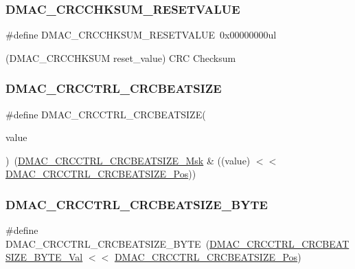 \subsubsection{\texorpdfstring{DMAC\_CRCCHKSUM\_RESETVALUE}{DMAC\_CRCCHKSUM\_RESETVALUE}}
{\footnotesize\ttfamily \#define D\+M\+A\+C\+\_\+\+C\+R\+C\+C\+H\+K\+S\+U\+M\+\_\+\+R\+E\+S\+E\+T\+V\+A\+L\+UE~0x00000000ul}



(D\+M\+A\+C\+\_\+\+C\+R\+C\+C\+H\+K\+S\+UM reset\+\_\+value) C\+RC Checksum 

\mbox{\label{group___s_a_m_d21___d_m_a_c_ga1f4897d6ab1e5c277e2d5e080cb6287e}} 
\subsubsection{\texorpdfstring{DMAC\_CRCCTRL\_CRCBEATSIZE}{DMAC\_CRCCTRL\_CRCBEATSIZE}}
{\footnotesize\ttfamily \#define D\+M\+A\+C\+\_\+\+C\+R\+C\+C\+T\+R\+L\+\_\+\+C\+R\+C\+B\+E\+A\+T\+S\+I\+ZE(\begin{DoxyParamCaption}\item[{}]{value }\end{DoxyParamCaption})~(\mbox{\hyperlink{group___s_a_m_d21___d_m_a_c_ga415ba82f52f569ca987ee0fafcef92c4}{D\+M\+A\+C\+\_\+\+C\+R\+C\+C\+T\+R\+L\+\_\+\+C\+R\+C\+B\+E\+A\+T\+S\+I\+Z\+E\+\_\+\+Msk}} \& ((value) $<$$<$ \mbox{\hyperlink{group___s_a_m_d21___d_m_a_c_ga363d4ea6d48fb9ce3a6c80e3be967852}{D\+M\+A\+C\+\_\+\+C\+R\+C\+C\+T\+R\+L\+\_\+\+C\+R\+C\+B\+E\+A\+T\+S\+I\+Z\+E\+\_\+\+Pos}}))}

\mbox{\label{group___s_a_m_d21___d_m_a_c_gac787d84ad6d945207c6e6ce517ec1202}} 
\subsubsection{\texorpdfstring{DMAC\_CRCCTRL\_CRCBEATSIZE\_BYTE}{DMAC\_CRCCTRL\_CRCBEATSIZE\_BYTE}}
{\footnotesize\ttfamily \#define D\+M\+A\+C\+\_\+\+C\+R\+C\+C\+T\+R\+L\+\_\+\+C\+R\+C\+B\+E\+A\+T\+S\+I\+Z\+E\+\_\+\+B\+Y\+TE~(\mbox{\hyperlink{group___s_a_m_d21___d_m_a_c_gafb441226141142da141437a86846bfc9}{D\+M\+A\+C\+\_\+\+C\+R\+C\+C\+T\+R\+L\+\_\+\+C\+R\+C\+B\+E\+A\+T\+S\+I\+Z\+E\+\_\+\+B\+Y\+T\+E\+\_\+\+Val}} $<$$<$ \mbox{\hyperlink{group___s_a_m_d21___d_m_a_c_ga363d4ea6d48fb9ce3a6c80e3be967852}{D\+M\+A\+C\+\_\+\+C\+R\+C\+C\+T\+R\+L\+\_\+\+C\+R\+C\+B\+E\+A\+T\+S\+I\+Z\+E\+\_\+\+Pos}})}


